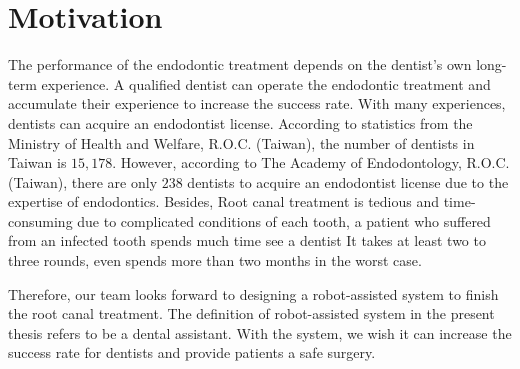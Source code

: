 \section{Motivation}
The performance of the endodontic treatment depends on the dentist's own long-term experience. A qualified dentist can operate the endodontic treatment and accumulate their experience to increase the success rate. With many experiences, dentists can acquire an endodontist license. According to statistics from the Ministry of Health and Welfare, R.O.C. (Taiwan), the number of dentists in Taiwan is $15,178$. However, according to The Academy of Endodontology, R.O.C. (Taiwan), there are only $238$ dentists to acquire an endodontist license due to the expertise of endodontics. Besides, Root canal treatment is tedious and time-consuming due to complicated conditions of each tooth, a patient who suffered from an infected tooth spends much time see a dentist It takes at least two to three rounds, even spends more than two months in the worst case. 
\par
Therefore, our team looks forward to designing a robot-assisted system to finish the root canal treatment. The definition of robot-assisted system in the present thesis refers to be a dental assistant. With the system, we wish it can increase the success rate for dentists and provide patients a safe surgery.

